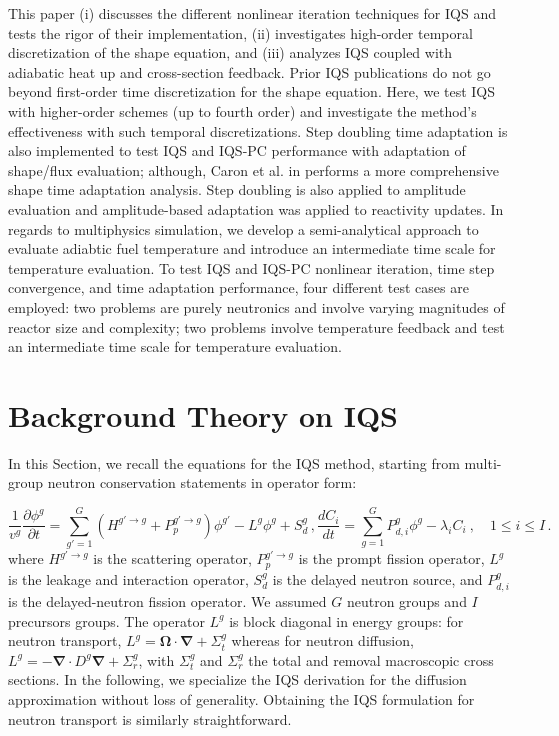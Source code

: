 \documentclass{elsarticle}
\renewcommand{\vec}[1]{\bm{#1}} %
\newcommand{\bs}[1]{\mathbf{#1}}
\renewcommand{\div}{\bs{\nabla}\! \cdot \!}
\newcommand{\grad}{\bs{\nabla}}
\newcommand{\iqspc}{IQS-PC\xspace}
\newcommand{\be}{\begin{equation}}
\newcommand{\ee}{\end{equation}}
\begin{document}
This paper (i) discusses the different nonlinear iteration techniques for IQS and tests the rigor of their implementation, (ii) investigates high-order temporal discretization of the shape equation,
and (iii) analyzes IQS coupled with adiabatic heat up and cross-section feedback. 
%
Prior IQS publications do not go beyond first-order time discretization for the shape equation. Here, we test IQS with higher-order schemes (up to fourth order) and investigate the method's 
effectiveness with such temporal discretizations. 
Step doubling time adaptation is also implemented to test IQS and \iqspc  performance with adaptation of shape/flux evaluation; although, Caron et al. in \cite{caron2017} performs a more comprehensive shape time adaptation analysis. Step doubling is also applied to amplitude evaluation and amplitude-based adaptation was applied to reactivity updates. In regards to multiphysics simulation, we develop a semi-analytical approach to evaluate adiabtic fuel temperature and introduce an intermediate time scale for temperature evaluation.
%
To test IQS and \iqspc nonlinear iteration, time step convergence, and time adaptation performance, four different test cases are employed: two problems are purely neutronics and involve varying magnitudes of reactor size and complexity; two problems involve temperature feedback and test an intermediate time scale for temperature evaluation.

\section{Background Theory on IQS}

In this Section, we recall the equations for the IQS method, starting from multi-group neutron conservation statements in operator form:

\begin{subequations}
\be
\frac{1}{v^g}\frac{\partial \phi^g}{\partial t} = \sum_{g'=1}^G \left(H^{g'\to g} + P_p^{g' \to g} \right) \phi^{g'} - L^g\phi^g + S_{d}^g \,,
\label{eq:flux}
\ee 
\be
\frac{dC_i}{dt} = \sum_{g=1}^G P_{d,i}^g \phi^{g} - \lambda_i C_i \ , \quad 1 \le i \le I  \,.
\label{eq:precursor}
\ee
\end{subequations}
%
where $H^{g'\to g}$ is the scattering operator, $P_p^{g' \to g}$ is the prompt fission operator, $L^g$ is the leakage and interaction operator, 
$S_{d}^g$ is the delayed neutron source, and $P_{d,i}^g$ is the delayed-neutron fission operator. We assumed $G$ neutron groups and $I$ precursors groups.
The operator $L^g$ is block diagonal in energy groups: for neutron transport, $L^g = \vec \Omega \cdot \grad + \Sigma_t^g$ whereas for neutron diffusion, 
$L^g = -\div D^g \grad + \Sigma_r^g$, with  $\Sigma_t^g$ and $\Sigma_r^g$ the total and removal macroscopic cross sections. In the following, we specialize the 
IQS derivation for the diffusion approximation without loss of generality. Obtaining the IQS formulation for neutron transport is similarly straightforward.
\end{document}
